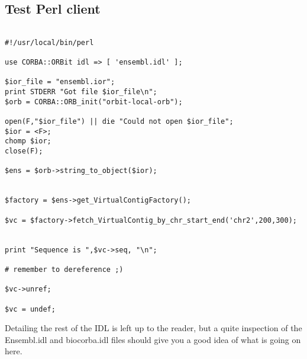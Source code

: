 \documentclass[11pt,a4paper]{article}
\begin{document}
\subsection{Test Perl client}

\begin{verbatim}

#!/usr/local/bin/perl

use CORBA::ORBit idl => [ 'ensembl.idl' ];

$ior_file = "ensembl.ior";
print STDERR "Got file $ior_file\n";
$orb = CORBA::ORB_init("orbit-local-orb");

open(F,"$ior_file") || die "Could not open $ior_file";
$ior = <F>;
chomp $ior;
close(F);

$ens = $orb->string_to_object($ior);


$factory = $ens->get_VirtualContigFactory();

$vc = $factory->fetch_VirtualContig_by_chr_start_end('chr2',200,300);


print "Sequence is ",$vc->seq, "\n";

# remember to dereference ;)

$vc->unref;

$vc = undef;

\end{verbatim}

Detailing the rest of the IDL is left up to the reader, but a quite
inspection of the Ensembl.idl and biocorba.idl files should give you a
good idea of what is going on here.
\end{document}
